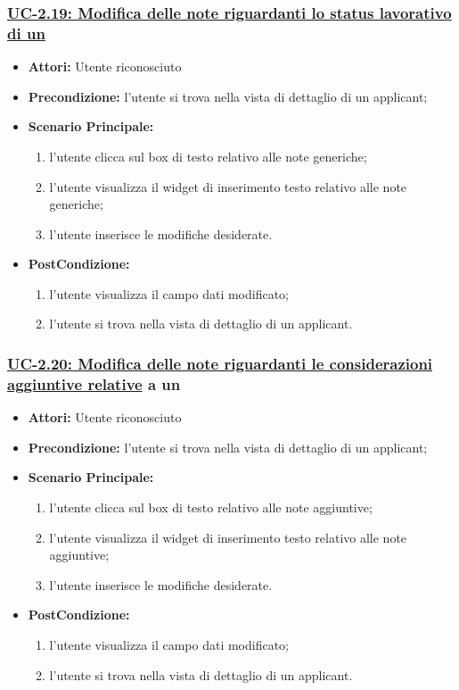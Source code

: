 \subsubsection{\underline{UC-2.19: Modifica delle note riguardanti lo status lavorativo di un \applicant}}
\begin{itemize}
	\item \textbf{Attori:} Utente riconosciuto
	\item \textbf{Precondizione:}  l'utente si trova nella vista di dettaglio di un applicant;
	\item \textbf{Scenario Principale:}
	\begin{enumerate}
		\item l'utente clicca sul box di testo relativo alle note generiche;
		\item l'utente visualizza il  widget di inserimento testo relativo alle note generiche;
		\item l'utente inserisce le modifiche desiderate.
	\end{enumerate}
	\item \textbf{PostCondizione:} 
	\begin{enumerate}
		\item l'utente visualizza il campo dati modificato;
		\item l'utente si trova nella vista di dettaglio di un applicant.
	\end{enumerate}
	
\end{itemize}

\subsubsection{\underline{UC-2.20: Modifica delle note riguardanti le considerazioni aggiuntive relative} a un \applicant}
\begin{itemize}
	\item \textbf{Attori:} Utente riconosciuto
	\item \textbf{Precondizione:}  l'utente si trova nella vista di dettaglio di un applicant;
	\item \textbf{Scenario Principale:}
	\begin{enumerate}
		\item l'utente clicca sul box di testo relativo alle note aggiuntive;
		\item l'utente visualizza il  widget di inserimento testo relativo alle note aggiuntive;
		\item l'utente inserisce le modifiche desiderate.
	\end{enumerate}
	\item \textbf{PostCondizione:} 
	\begin{enumerate}
		\item l'utente visualizza il campo dati modificato;
		\item l'utente si trova nella vista di dettaglio di un applicant.
	\end{enumerate}
	
\end{itemize}



